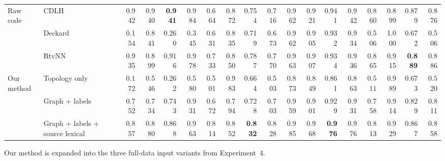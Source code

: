 \documentclass[10pt]{article}
\newcommand{\best}[1]{\cellcolor{bestgreen}\textbf{#1}}
\begin{document}
\begin{landscape}
\begin{table}[p]
{\begin{tabular}{llrrrrrrrrrrrrrrrr}
\midrule
\multirow{3}{*}{Raw code} & CDLH & 0.942 & 0.940 & \best{0.941} & 0.984 & 0.664 & 0.872 & 0.754 & 0.716 & 0.962 & 0.921 & 0.941 & 0.942 & 0.860 & 0.899 & 0.879 & 0.876 \\
 & Deckard & 0.154 & 0.841 & 0.260 & 0.345 & 0.631 & 0.835 & 0.719 & 0.673 & 0.962 & 0.905 & 0.932 & 0.934 & 0.506 & 1.000 & 0.672 & 0.506 \\
 & RtvNN & 0.935 & 0.899 & 0.916 & 0.978 & 0.733 & 0.850 & 0.787 & 0.770 & 0.963 & 0.907 & 0.934 & 0.936 & 0.865 & 0.915 & \best{0.889} & 0.886 \\
\midrule
\multirow{3}{*}{Our method} & Topology only & 0.172 & 0.546 & 0.262 & 0.580 & 0.501 & 0.983 & 0.664 & 0.503 & 0.873 & 0.849 & 0.861 & 0.863 & 0.511 & 0.989 & 0.673 & 0.520 \\
 & Graph + labels & 0.752 & 0.734 & 0.743 & 0.931 & 0.672 & 0.794 & 0.728 & 0.703 & 0.959 & 0.901 & 0.929 & 0.931 & 0.758 & 0.914 & 0.829 & 0.811 \\
 & Graph + labels + source lexical & 0.857 & 0.880 & 0.868 & 0.963 & 0.814 & 0.852 & \best{0.832} & 0.828 & 0.985 & 0.968 & \best{0.976} & 0.976 & 0.813 & 0.929 & 0.867 & 0.858 \\
\bottomrule
\end{tabular}
}
\vspace{2pt}\parbox{\linewidth}{\footnotesize Our method is expanded into the three full-data input variants from Experiment~4.}
\end{table}
\end{landscape}
\clearpage
\end{document}
